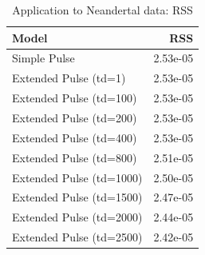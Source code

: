 \documentclass[11pt]{article}
\begin{document}
\begin{table}[H]

\caption{\label{tab:table_Supplements_Application_to_Neandertal_data_RSS} Application to Neandertal data: RSS}
\centering
\begin{tabular}[t]{l|r}
\hline
Model & RSS\\
\hline
Simple Pulse & 2.53e-05\\
\cline{1-2}
Extended Pulse (td=1) & 2.53e-05\\
\cline{1-2}
Extended Pulse (td=100) & 2.53e-05\\
\cline{1-2}
Extended Pulse (td=200) & 2.53e-05\\
\cline{1-2}
Extended Pulse (td=400) & 2.53e-05\\
\cline{1-2}
Extended Pulse (td=800) & 2.51e-05\\
\cline{1-2}
Extended Pulse (td=1000) & 2.50e-05\\
\cline{1-2}
Extended Pulse (td=1500) & 2.47e-05\\
\cline{1-2}
Extended Pulse (td=2000) & 2.44e-05\\
\cline{1-2}
Extended Pulse (td=2500) & 2.42e-05\\
\hline
\end{tabular}
\end{table}
\end{document}
